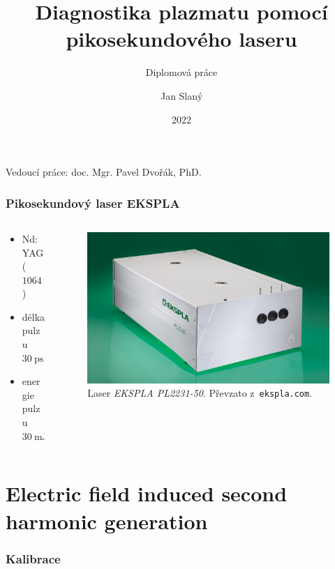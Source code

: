 \documentclass{beamer}
\title[Laserová diagnostika plazmatu]
{Diagnostika plazmatu pomocí pikosekundového laseru}
\subtitle{Diplomová práce}
\date{2022}
\author{Jan Slaný}
\institute[PřF MUNI]{Přírodovědecká fakulta Masarykovy univerzity\\
	Ústav fyzikální elektroniky}
\begin{document}
\begin{frame}[plain]
	\titlepage
	\footnotesize
	Vedoucí práce: \hfill doc. Mgr. Pavel Dvořák, PhD.
\end{frame}

\begin{frame}
	\frametitle{Pikosekundový laser EKSPLA}
	\begin{columns}
	\begin{column}{0.5\textwidth}
		\begin{itemize}
			\item Nd:YAG ($\SI{1064}{\nano\metre}$)
			\item délka pulzu $\SI{30}{\pico\second}$
			\item energie pulzu $\SI{30}{\milli\joule}$
		\end{itemize}
	\end{column}
	\begin{column}{0.5\textwidth}
		\begin{figure}
			\centering
			\includegraphics[width=\textwidth]{laser}
			\caption{Laser \emph{EKSPLA PL2231-50}.
				Převzato z~\texttt{ekspla.com}.}
		\end{figure}
	\end{column}
	\end{columns}
\end{frame}

\section[E-FISH]{Electric field induced second harmonic generation}

\begin{frame}
	\frametitle{Kalibrace}
	\graphicspath{{../efish/}}
	
\end{frame}
\end{document}
